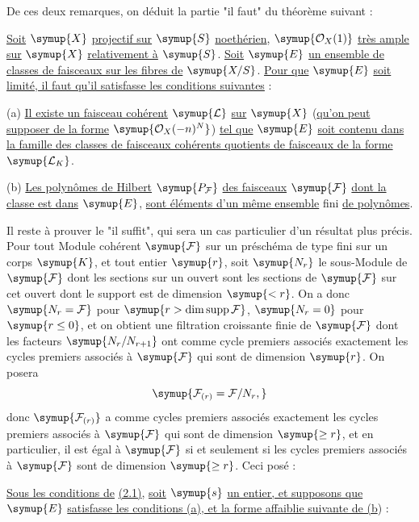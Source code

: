 De ces deux remarques, on déduit la partie "il faut" du théorème suivant :

 \uline{Soit} $\symup{X}$ \uline{projectif sur} $\symup{S}$ \uline{noethérien},
$\symup{\mathcal O_X(1)}$ \uline{très ample sur} $\symup{X}$ \uline{relativement à} $\symup{S}$. \uline{Soit} $\symup{E}$ \uline{un ensemble
de classes de faisceaux sur les fibres de} $\symup{X/S}$. \uline{Pour que} $\symup{E}$ \uline{soit limité, il
faut qu'il
satisfasse les conditions suivantes} :

\medskip
\noindent (a) \uline{Il existe un faisceau cohérent} $\symup{\mathcal L}$ \uline{sur} $\symup{X}$ (\uline{qu'on peut
supposer de la forme} $\symup{\mathcal O_X(-n)^N}$) \uline{tel que} $\symup{E}$ \uline{soit contenu dans la
famille des classes de faisceaux cohérents quotients de faisceaux de la forme}
$\symup{\mathcal L_K}$.

\smallskip
\noindent (b) \uline{Les polynômes de Hilbert} $\symup{P_{\mathcal F}}$ \uline{des faisceaux}
$\symup{\mathcal F}$ \uline{dont la classe est dans} $\symup{E}$, \uline{sont éléments d'un même ensemble} fini
\uline{de polynômes}.

Il reste à prouver le "il suffit", qui sera un cas particulier d'un résultat
plus précis. Pour tout Module cohérent $\symup{\mathcal F}$ sur un préschéma de type
fini sur un corps $\symup{K}$, et tout entier $\symup{r}$, soit $\symup{N_r}$ le sous-Module de
$\symup{\mathcal F}$ dont les sections sur un ouvert sont les sections de $\symup{\mathcal F}$
sur cet ouvert dont le support est de dimension $\symup{<r}$. On a donc
$\symup{N_r=\mathcal F}$ pour $\symup{r>\dim\operatorname{supp}\mathcal F}$, $\symup{N_r=0}$ pour
$\symup{r\leq0}$, et on obtient une filtration croissante finie de $\symup{\mathcal F}$ dont
les facteurs $\symup{N_r/N_{r+1}}$ ont comme cycle premiers associés exactement les cycles premiers
associés à $\symup{\mathcal F}$ qui sont de dimension $\symup{r}$. On posera
\[
\symup{\mathcal F_{(r)}=\mathcal F/N_r,}
\]
donc $\symup{\mathcal F_{(r)}}$ a comme cycles premiers associés exactement les cycles
premiers associés à $\symup{\mathcal F}$ qui sont de dimension $\symup{\geq r}$, et en
particulier, il est égal à $\symup{\mathcal F}$ si et seulement si les cycles premiers
associés à $\symup{\mathcal F}$ sont de dimension $\symup{\geq r}$. Ceci posé :

 \uline{Sous les conditions de} \uline{(2.1)}, \uline{soit} $\symup{s}$ \uline{un entier, et
supposons que} $\symup{E}$ \uline{satisfasse les conditions (a), et la forme affaiblie suivante
de (b}) :

